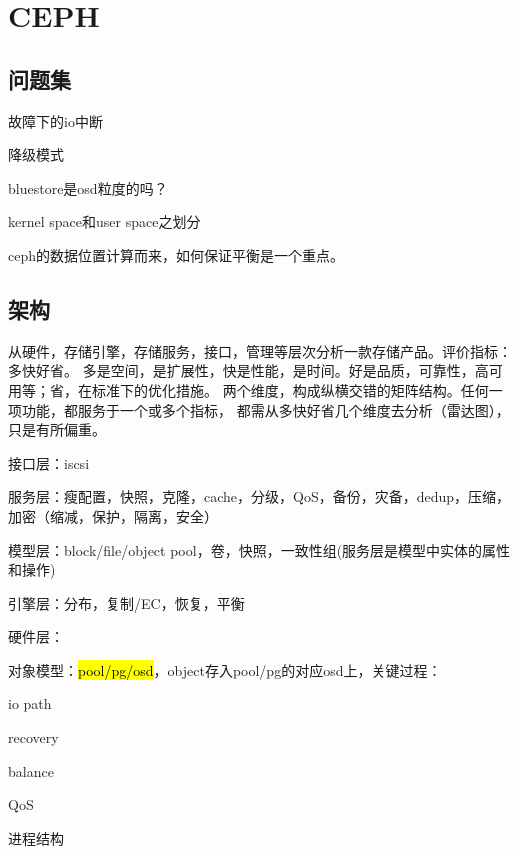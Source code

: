\chapter{CEPH}

\section{问题集}

\begin{enumbox}
\item 故障下的io中断
\item 降级模式
\item bluestore是osd粒度的吗？
\item kernel space和user space之划分
\item ceph的数据位置计算而来，如何保证平衡是一个重点。
\end{enumbox}

\section{架构}

从硬件，存储引擎，存储服务，接口，管理等层次分析一款存储产品。评价指标：多快好省。
多是空间，是扩展性，快是性能，是时间。好是品质，可靠性，高可用等；省，在标准下的优化措施。
两个维度，构成纵横交错的矩阵结构。任何一项功能，都服务于一个或多个指标，
都需从多快好省几个维度去分析（雷达图），只是有所偏重。

\begin{enumbox}
\item 接口层：iscsi
\item 服务层：瘦配置，快照，克隆，cache，分级，QoS，备份，灾备，dedup，压缩，加密（缩减，保护，隔离，安全）
\item 模型层：block/file/object pool，卷，快照，一致性组(服务层是模型中实体的属性和操作)
\item 引擎层：分布，复制/EC，恢复，平衡
\item 硬件层：
\end{enumbox}

对象模型：\hl{pool/pg/osd}，object存入pool/pg的对应osd上，关键过程：
\begin{enumbox}
\item io path
\item recovery
\item balance
\item QoS
\end{enumbox}

进程结构


